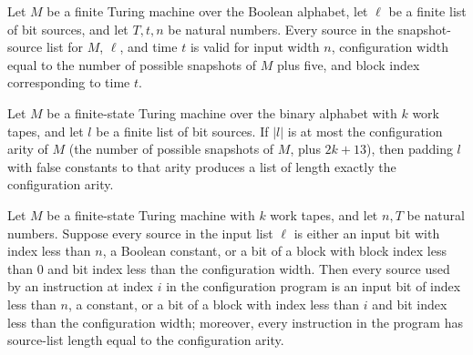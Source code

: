 \begin{theorem}
\label{Complexity.snapSrcs_valid}
\leanok
{}
Let $M$ be a finite Turing machine over the Boolean alphabet, let $\ell$ be a finite
list of bit sources, and let $T,t,n$ be natural numbers. Every source in the
snapshot-source list for $M$, $\ell$, and time $t$ is valid for input width $n$,
configuration width equal to the number of possible snapshots of $M$ plus five, and
block index corresponding to time $t$.
\end{theorem}

\begin{theorem}
\label{Complexity.length_padSrcs}
\leanok
{}
Let $M$ be a finite-state Turing machine over the binary alphabet with $k$ work tapes,
and let $l$ be a finite list of bit sources. If $|l|$ is at most the configuration arity
of $M$ (the number of possible snapshots of $M$, plus $2k+13$), then padding $l$ with
false constants to that arity produces a list of length exactly the configuration arity.
\end{theorem}

\begin{theorem}
\label{Complexity.cfgProg_wf}
\leanok
{}
Let $M$ be a finite-state Turing machine with $k$ work tapes, and let $n,T$ be natural
numbers. Suppose every source in the input list $\ell$ is either an input bit with index
less than $n$, a Boolean constant, or a bit of a block with block index less than $0$
and bit index less than the configuration width. Then every source used by an
instruction at index $i$ in the configuration program is an input bit of index less than
$n$, a constant, or a bit of a block with index less than $i$ and bit index less than
the configuration width; moreover, every instruction in the program has source-list
length equal to the configuration arity.
\end{theorem}

